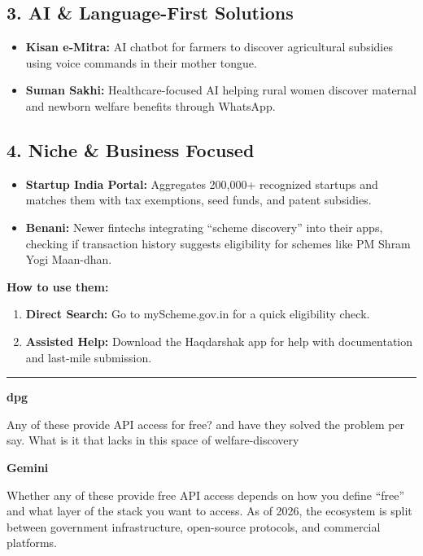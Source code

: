 \documentclass[11pt,a4paper]{article}
\begin{document}
\subsection*{3. AI \& Language-First Solutions}
\begin{itemize}[nosep]
\item \textbf{Kisan e-Mitra:} AI chatbot for farmers to discover agricultural subsidies using voice commands in their mother tongue.
\item \textbf{Suman Sakhi:} Healthcare-focused AI helping rural women discover maternal and newborn welfare benefits through WhatsApp.
\end{itemize}

\subsection*{4. Niche \& Business Focused}
\begin{itemize}[nosep]
\item \textbf{Startup India Portal:} Aggregates 200,000+ recognized startups and matches them with tax exemptions, seed funds, and patent subsidies.
\item \textbf{Benani:} Newer fintechs integrating ``scheme discovery'' into their apps, checking if transaction history suggests eligibility for schemes like PM Shram Yogi Maan-dhan.
\end{itemize}

\textbf{How to use them:}
\begin{enumerate}[nosep]
\item \textbf{Direct Search:} Go to myScheme.gov.in for a quick eligibility check.
\item \textbf{Assisted Help:} Download the Haqdarshak app for help with documentation and last-mile submission.
\end{enumerate}

\bigskip
\hrule
\bigskip


{\small\color{primary}\textbf{dpg}}
\begin{mebox}
Any of these provide API access for free? and have they solved the problem per say. What is it that lacks in this space of welfare-discovery
\end{mebox}

{\small\color{secondary}\textbf{Gemini}}\vspace{2pt}

Whether any of these provide free API access depends on how you define ``free'' and what layer of the stack you want to access. As of 2026, the ecosystem is split between government infrastructure, open-source protocols, and commercial platforms.
\end{document}
